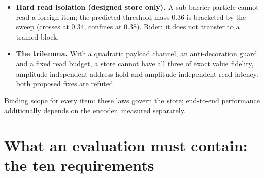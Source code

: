 \documentclass{article} %
\begin{document}
\begin{itemize}[leftmargin=*,itemsep=1pt]
  memory 6.3 KB against 6.00 MB at $T=1024$; exact only at zero damping. %
\item \textbf{Hard read isolation (designed store only).} A sub-barrier particle cannot read a
  foreign item; the predicted threshold mass 0.36 is bracketed by the sweep (crosses at 0.34,
  confines at 0.38). Rider: it does not transfer to a trained block. %
\item \textbf{The trilemma.} With a quadratic payload channel, an anti-decoration guard and a fixed
  read budget, a store cannot have all three of exact value fidelity, amplitude-independent address
  hold and amplitude-independent read latency; both proposed fixes are refuted.
\end{itemize}
Binding scope for every item: these laws govern the store; end-to-end performance additionally
depends on the encoder, measured separately. %

\section{What an evaluation must contain: the ten requirements}
\label{app:bench}
\end{document}
